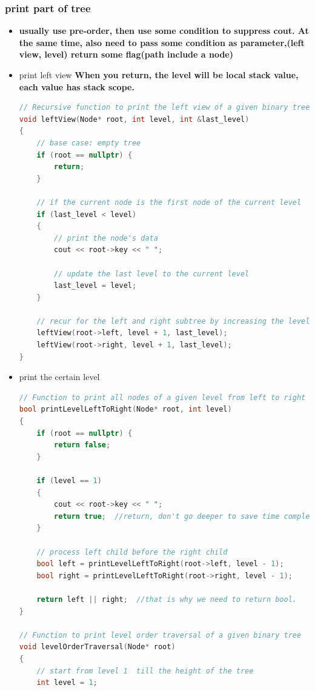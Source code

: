 \documentclass[a4paper,11pt,twoside]{book}
\begin{document}
\subsubsection{print part of tree}
\begin{itemize}
	\item \textbf{usually use pre-order, then use some condition to suppress cout. At the same time, also need to pass some condition as parameter,(left view, level) return some flag(path include a node)}
	
	\item print left view \textbf{When you return, the level will be local stack value, each value has stack scope.}

\begin{lstlisting}[frame=single, language=c++]
// Recursive function to print the left view of a given binary tree
void leftView(Node* root, int level, int &last_level)
{
	// base case: empty tree
	if (root == nullptr) {
		return;
	}
	
	// if the current node is the first node of the current level
	if (last_level < level)
	{
		// print the node's data
		cout << root->key << " ";
		
		// update the last level to the current level
		last_level = level;
	}
	
	// recur for the left and right subtree by increasing the level by 1
	leftView(root->left, level + 1, last_level);
	leftView(root->right, level + 1, last_level);
}	
\end{lstlisting}	

	\item print the certain level
\begin{lstlisting}[frame=single, language=c++]
// Function to print all nodes of a given level from left to right
bool printLevelLeftToRight(Node* root, int level)
{
	if (root == nullptr) {
		return false;
	}
	
	if (level == 1)
	{
		cout << root->key << " ";
		return true;  //return, don't go deeper to save time complexity.
	}
	
	// process left child before the right child
	bool left = printLevelLeftToRight(root->left, level - 1);
	bool right = printLevelLeftToRight(root->right, level - 1);
	
	return left || right;  //that is why we need to return bool. 
}

// Function to print level order traversal of a given binary tree
void levelOrderTraversal(Node* root)
{
	// start from level 1  till the height of the tree
	int level = 1;
	

\end{lstlisting}
\end{itemize}
\end{document}
